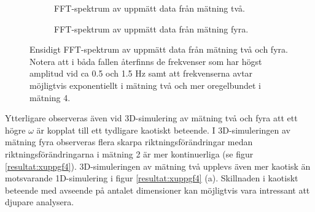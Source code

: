 \documentclass[12pt,a4paper]{article}
\makeatletter
\newlength\fheight
\newcommand*{\rom}[1]{\expandafter\@slowromancap\romannumeral #1@}
\makeatother
\begin{document}




\begin{figure}[H]
    \centering
    \begin{subfigure}[b]{0.49\textwidth}
        \centering
        \setlength\fheight{1.4in}
        
        \caption{FFT-spektrum av uppmätt data från mätning två.}
    \end{subfigure}
    \hfill
    \begin{subfigure}[b]{0.49\textwidth}
        \centering
        \setlength\fheight{1.4in}
        
        \caption{FFT-spektrum av uppmätt data från mätning fyra.}
    \end{subfigure}
    \caption{Ensidigt FFT-spektrum av uppmätt data från mätning två och fyra. Notera att i båda fallen återfinns de frekvenser som har högst amplitud vid ca 0.5 och 1.5 Hz samt att frekvenserna avtar möjligtvis exponentiellt i mätning två och mer oregelbundet i mätning 4.}
    \label{resultat:xuppgf3}
\end{figure}


Ytterligare observeras även vid 3D-simulering av mätning två och fyra att ett högre $\omega$ är kopplat till ett tydligare kaotiskt beteende. I 3D-simuleringen av mätning fyra observeras flera skarpa riktningsförändringar medan riktningsförändringarna i mätning 2 är mer kontinuerliga (se figur \ref{resultat:xuppgf4}). 3D-simuleringen av mätning två upplevs även mer kaotisk än motsvarande 1D-simulering i figur \ref{resultat:xuppgf4} (a). Skillnaden i kaotiskt beteende med avseende på antalet dimensioner kan möjligtvis vara intressant att djupare analysera.

\end{document}
